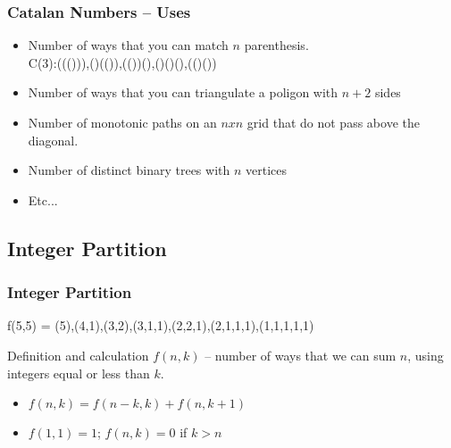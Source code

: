 \begin{frame}
  \frametitle{Catalan Numbers -- Uses}
  \begin{itemize}
    \item Number of ways that you can match $n$ parenthesis.\\
      C(3):((())),()(()),(())(),()()(),(()())

      \medskip

    \item Number of ways that you can triangulate a poligon with $n+2$ sides
    \item Number of monotonic paths on an $nxn$ grid that do not pass above
      the diagonal.
    \item Number of distinct binary trees with $n$ vertices
    \item Etc...
  \end{itemize}
\end{frame}

\subsection{Integer Partition}
\begin{frame}
  \frametitle{Integer Partition}
  \begin{block}{}
    f(5,5) = (5),(4,1),(3,2),(3,1,1),(2,2,1),(2,1,1,1),(1,1,1,1,1)
  \end{block}
  \begin{block}{Definition and calculation}
    $f(n,k)$ -- number of ways that we can sum $n$, using integers
    equal or less than $k$.

    \bigskip

    \begin{itemize}
    \item $f(n,k) = f(n-k,k) + f(n, k+1)$
    \item $f(1,1) = 1$; $f(n,k) = 0$ if $k > n$
    \end{itemize}
  \end{block}
\end{frame}




